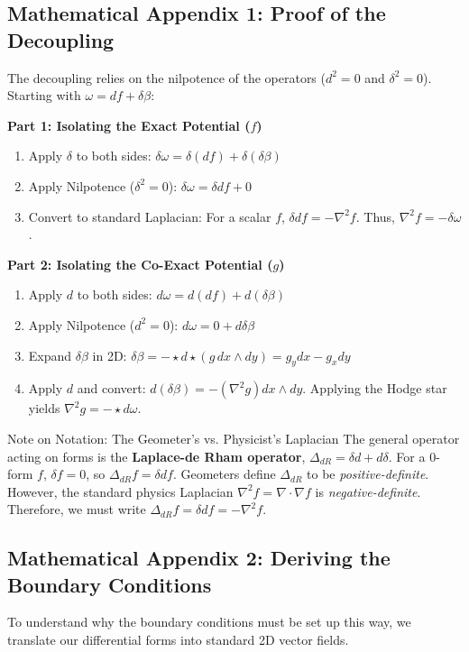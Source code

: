 \documentclass[11pt]{article}
\begin{document}
\subsection*{Mathematical Appendix 1: Proof of the Decoupling}
The decoupling relies on the nilpotence of the operators ($d^2 = 0$ and $\delta^2 = 0$). Starting with $\omega = df + \delta\beta$:

\textbf{Part 1: Isolating the Exact Potential ($f$)}
\begin{enumerate}[noitemsep]
    \item Apply $\delta$ to both sides: $\delta\omega = \delta(df) + \delta(\delta\beta)$
    \item Apply Nilpotence ($\delta^2 = 0$): $\delta\omega = \delta d f + 0$
    \item Convert to standard Laplacian: For a scalar $f$, $\delta d f = -\nabla^2 f$. Thus, $\nabla^2 f = -\delta\omega$.
\end{enumerate}

\textbf{Part 2: Isolating the Co-Exact Potential ($g$)}
\begin{enumerate}[noitemsep]
    \item Apply $d$ to both sides: $d\omega = d(df) + d(\delta\beta)$
    \item Apply Nilpotence ($d^2 = 0$): $d\omega = 0 + d\delta\beta$
    \item Expand $\delta\beta$ in 2D: $\delta\beta = -\star d \star (g \, dx \wedge dy) = g_y dx - g_x dy$
    \item Apply $d$ and convert: $d(\delta\beta) = -(\nabla^2 g) dx \wedge dy$. Applying the Hodge star yields $\nabla^2 g = -\star d\omega$.
\end{enumerate}

\begin{warnbox}{Note on Notation: The Geometer's vs. Physicist's Laplacian}
The general operator acting on forms is the \textbf{Laplace-de Rham operator}, $\Delta_{dR} = \delta d + d\delta$.
For a 0-form $f$, $\delta f = 0$, so $\Delta_{dR} f = \delta d f$.
Geometers define $\Delta_{dR}$ to be \textit{positive-definite}. However, the standard physics Laplacian $\nabla^2 f = \nabla \cdot \nabla f$ is \textit{negative-definite}. Therefore, we must write $\Delta_{dR} f = \delta d f = -\nabla^2 f$.
\end{warnbox}

\subsection*{Mathematical Appendix 2: Deriving the Boundary Conditions}
To understand why the boundary conditions must be set up this way, we translate our differential forms into standard 2D vector fields.
\end{document}
